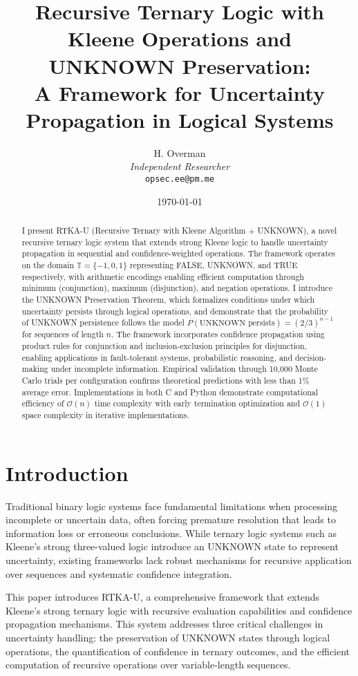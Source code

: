 \documentclass[11pt,a4paper]{article}
\title{Recursive Ternary Logic with Kleene Operations and UNKNOWN Preservation:\\
A Framework for Uncertainty Propagation in Logical Systems}
\author{H. Overman\\
\textit{Independent Researcher}\\
\texttt{opsec.ee@pm.me}}
\date{\today}
\begin{document}
\maketitle

\begin{abstract}
I present RTKA-U (Recursive Ternary with Kleene Algorithm + UNKNOWN), a novel recursive ternary logic system that extends strong Kleene logic to handle uncertainty propagation in sequential and confidence-weighted operations. The framework operates on the domain $\mathbb{T} = \{-1, 0, 1\}$ representing FALSE, UNKNOWN, and TRUE respectively, with arithmetic encodings enabling efficient computation through minimum (conjunction), maximum (disjunction), and negation operations. I introduce the UNKNOWN Preservation Theorem, which formalizes conditions under which uncertainty persists through logical operations, and demonstrate that the probability of UNKNOWN persistence follows the model $P(\text{UNKNOWN persists}) = (2/3)^{n-1}$ for sequences of length $n$. The framework incorporates confidence propagation using product rules for conjunction and inclusion-exclusion principles for disjunction, enabling applications in fault-tolerant systems, probabilistic reasoning, and decision-making under incomplete information. Empirical validation through 10,000 Monte Carlo trials per configuration confirms theoretical predictions with less than 1\% average error. Implementations in both C and Python demonstrate computational efficiency of $\mathcal{O}(n)$ time complexity with early termination optimization and $\mathcal{O}(1)$ space complexity in iterative implementations.
\end{abstract}

\section{Introduction}

Traditional binary logic systems face fundamental limitations when processing incomplete or uncertain data, often forcing premature resolution that leads to information loss or erroneous conclusions. While ternary logic systems such as Kleene's strong three-valued logic \cite{kleene1952} introduce an UNKNOWN state to represent uncertainty, existing frameworks lack robust mechanisms for recursive application over sequences and systematic confidence integration.

This paper introduces RTKA-U, a comprehensive framework that extends Kleene's strong ternary logic with recursive evaluation capabilities and confidence propagation mechanisms. This system addresses three critical challenges in uncertainty handling: the preservation of UNKNOWN states through logical operations, the quantification of confidence in ternary outcomes, and the efficient computation of recursive operations over variable-length sequences.
\end{document}
